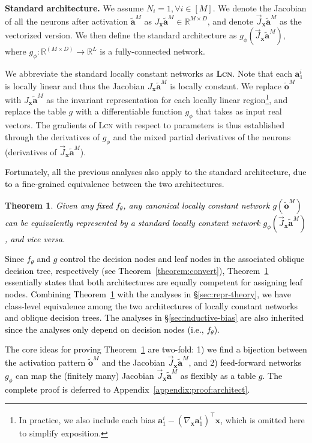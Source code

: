 \documentclass{article} \usepackage{iclr2020_conference,times}
\newtheorem{theorem}{Theorem}\newtheorem{definition}[theorem]{Definition}
\newcommand{\textcyan}[1]{\textcolor{black}{#1}}
\def\va{{\bm{a}}}
\def\vo{{\bm{o}}}
\def\vx{{\bm{x}}}
\def\sR{{\mathbb{R}}}
\newcommand{\xref}[1]{\S\ref{#1}}
\begin{document}
\textbf{Standard architecture.} 
We assume $N_i=1, \forall i \in [M]$. We denote the Jacobian of all the neurons after activation $\tilde \va^M$ as $J_\vx \tilde \va^M \in \sR^{M \times D}$, and denote $\vec J_\vx \tilde \va^M$ as the vectorized version. We then define the standard architecture as $g_\phi(\vec J_\vx \tilde \va^M)$, where $g_\phi: \sR^{(M \times D)} \to \sR^{L}$ is a fully-connected network.

We abbreviate the standard locally constant networks as \textbf{\textsc{Lcn}}. Note that each $\va^i_1$ is locally linear and thus the Jacobian $J_\vx \tilde \va^M$ is locally constant.
We replace $\tilde \vo^M$ with $J_\vx \tilde \va^M$ as the invariant representation for each locally linear region\footnote{In practice, we also include each bias $\va^i_1 - (\nabla_\vx \va^i_1)^\top \vx$, which is omitted here to simplify exposition.},
and replace the table $g$ with a differentiable function $g_\phi$ that takes as input real vectors. The gradients of \textsc{Lcn} with respect to parameters is thus established through the derivatives of $g_\phi$ and the mixed partial derivatives of the neurons (derivatives of $\vec J_\vx \tilde \va^M$). 


\textcyan{Fortunately, all the previous analyses also apply to the standard architecture, due to a fine-grained equivalence between the two architectures.}
\begin{theorem}
\textcyan{Given any fixed $f_\theta$, any canonical locally constant network $g(\tilde \vo^M)$ can be equivalently represented by a standard locally constant network $g_\phi(\vec J_\vx \tilde \va^M)$, and vice versa.}
\label{thm:architecture_equivalence}
\end{theorem}
\textcyan{Since $f_\theta$ and $g$ control the decision nodes and leaf nodes in the associated oblique decision tree, respectively (see Theorem~\ref{theorem:convert}), Theorem~\ref{thm:architecture_equivalence} essentially states that both architectures are equally competent for assigning leaf nodes. Combining Theorem~\ref{thm:architecture_equivalence} with the analyses in \xref{sec:repr-theory}, we have class-level equivalence among the two architectures of locally constant networks and oblique decision trees. The analyses in \xref{sec:inductive-bias} are also inherited since the analyses only depend on decision nodes (i.e., $f_\theta$).}

\textcyan{The core ideas for proving Theorem~\ref{thm:architecture_equivalence} are two-fold: 1) we find a bijection between the activation pattern $\tilde \vo^M$ and the Jacobian $\vec J_\vx \tilde \va^M$, and 2) feed-forward networks $g_\phi$ can map the (finitely many) Jacobian $\vec J_\vx \tilde \va^M$ as flexibly as a table $g$. The complete proof is deferred to Appendix~\ref{appendix:proof:architect}.}
\end{document}
